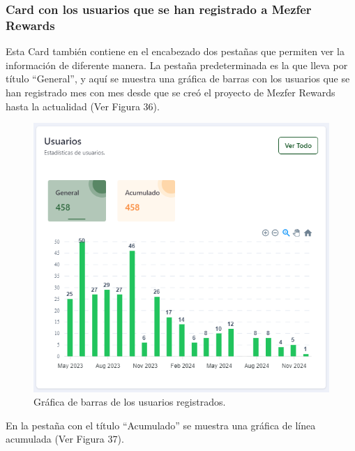 \subsubsection{Card con los usuarios que se han registrado a Mezfer Rewards}
Esta Card también contiene en el encabezado dos pestañas que permiten ver la información de diferente manera. La pestaña predeterminada es la que lleva por título ``General'', y aquí se muestra una gráfica de barras con los usuarios que se han registrado mes con mes desde que se creó el proyecto de Mezfer Rewards hasta la actualidad (Ver Figura 36).

    \begin{figure}[H]
        \begin{center}
            \includegraphics[scale=0.40]{img/actividades/dahsboard-admin/usuarios-general.png}
            \caption{Gráfica de barras de los usuarios registrados.}
            \label{fig:usuarios-general}
        \end{center}
    \end{figure}

En la pestaña con el título ``Acumulado'' se muestra una gráfica de línea acumulada (Ver Figura 37).

